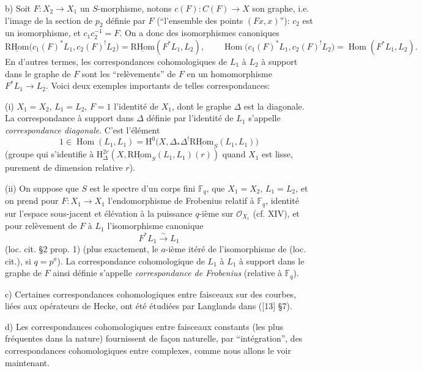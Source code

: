 \documentclass[11pt]{article}
\renewcommand{\H}{\mathrm{H}}
\DeclareMathOperator{\Hom}{Hom}
\newcommand{\R}{\mathrm{R}}\newcommand{\RHomCore}{\mathrm{RHom}}
\providecommand{\RHom}{\RHomCore}
\providecommand{\uRHom}{\underline{\RHom}}
\providecommand{\RHom}{\RHomCore}
\providecommand{\Hom}{\operatorname{Hom}}
\providecommand{\RHom}{\R\mathcal{H}om}
\providecommand{\R}{\mathrm R}
\providecommand{\RHom}{\RHomCore}
\providecommand{\Hom}{\operatorname{Hom}}
\begin{document}
b) Soit $F:X_2\to X_1$ un $S$-morphisme, notons $c(F):C(F)\to X$ son graphe, i.e. l'image de la section de $p_2$ définie par $F$ (``l'ensemble des points $(Fx,x)$''): $c_2$ est un isomorphisme, et $c_1c_2^{-1}=F$. On a donc des isomorphismes canoniques
\begin{equation}
\uRHom\bigl(c_1(F)^*L_1,c_2(F)^!L_2\bigr)=\uRHom(F^*L_1,L_2),
\qquad
\Hom\bigl(c_1(F)^*L_1,c_2(F)^!L_2\bigr)=\Hom(F^*L_1,L_2).
\tag{3.2.6}
\end{equation}
En d'autres termes, les correspondances cohomologiques de $L_1$ à $L_2$ à support dans le graphe de $F$ sont les ``relèvements'' de $F$ en un homomorphisme $F^*L_1\to L_2$. Voici deux exemples importants de telles correspondances:

(i) $X_1=X_2$, $L_1=L_2$, $F=1$ l'identité de $X_1$, dont le graphe $\Delta$ est la diagonale. La correspondance à support dans $\Delta$ définie par l'identité de $L_1$ s'appelle \emph{correspondance diagonale}. C'est l'élément
\[
1\in \Hom(L_1,L_1)=\H^0\bigl(X,\Delta_*\Delta^!\uRHom_S(L_1,L_1)\bigr)
\]
(groupe qui s'identifie à $\H^{2r}_\Delta(X,\uRHom_S(L_1,L_1)(r))$ quand $X_1$ est lisse, purement de dimension relative $r$).

(ii) On suppose que $S$ est le spectre d'un corps fini $\mathbb F_q$, que $X_1=X_2$, $L_1=L_2$, et on prend pour $F:X_1\to X_1$ l'endomorphisme de Frobenius relatif à $\mathbb F_q$, identité sur l'espace sous-jacent et élévation à la puissance $q$-ième sur $\mathcal O_{X_1}$ (cf. XIV), et pour relèvement de $F$ à $L_1$ l'isomorphisme canonique
\[
F^*L_1\xrightarrow{\sim}L_1
\]
(loc. cit. §2 prop. 1) (plus exactement, le $a$-ième itéré de l'isomorphisme de (loc. cit.), si $q=p^a$). La correspondance cohomologique de $L_1$ à $L_1$ à support dans le graphe de $F$ ainsi définie s'appelle \emph{correspondance de Frobenius} (relative à $\mathbb F_q$).

c) Certaines correspondances cohomologiques entre faisceaux sur des courbes, liées aux opérateurs de Hecke, ont été étudiées par Langlands dans ([13] §7).

d) Les correspondances cohomologiques entre faisceaux constants (les plus fréquentes dans la nature) fournissent de façon naturelle, par ``intégration'', des correspondances cohomologiques entre complexes, comme nous allons le voir maintenant.
\end{document}
